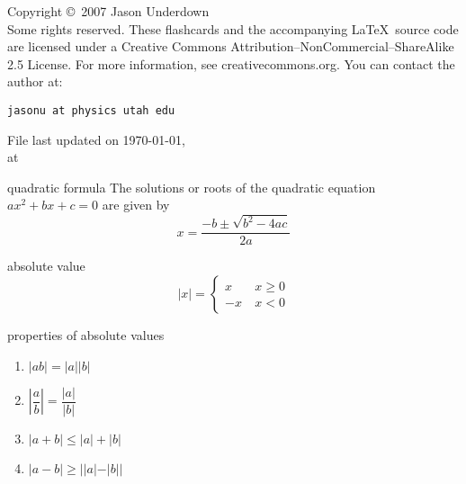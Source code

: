 \documentclass[avery5371,grid]{flashcards}
\begin{document}
\begin{flashcard}{Copyright \copyright \, 2007 Jason Underdown \\
Some rights reserved.}
These flashcards and the accompanying \LaTeX \, source code are licensed
under a Creative Commons Attribution--NonCommercial--ShareAlike 2.5 License.  
For more information, see creativecommons.org.  You can contact the author at:
\begin{center}
\begin{small}\tt jasonu at physics utah edu\end{small}

\medskip
File last updated on \today, \\
at \currenttime
\end{center}
\end{flashcard}

\begin{flashcard}[Formula]{quadratic formula}
The solutions or roots of the quadratic equation \\
$ax^2 + bx + c = 0$ are given by
\begin{equation*}
x = \dfrac{-b\pm \sqrt{b^2-4ac}}{2a}
\end{equation*}
\end{flashcard}

\begin{flashcard}[Definition]{absolute value}
\begin{equation*}
|x| = \left\{ \begin{array}{ll}
x & \: x \geq 0 \\
-x & \: x < 0
\end{array} \right.
\end{equation*}
\end{flashcard}

\begin{flashcard}[Theorem]{properties of absolute values}
\begin{enumerate}
\item $|ab| = |a||b|$
\item $\left| \dfrac{a}{b} \right| = \dfrac{|a|}{|b|}$
\item $|a+b| \leq |a| + |b|$
\item $|a-b| \geq ||a| - |b||$
\end{enumerate}

\end{flashcard}
\end{document}
